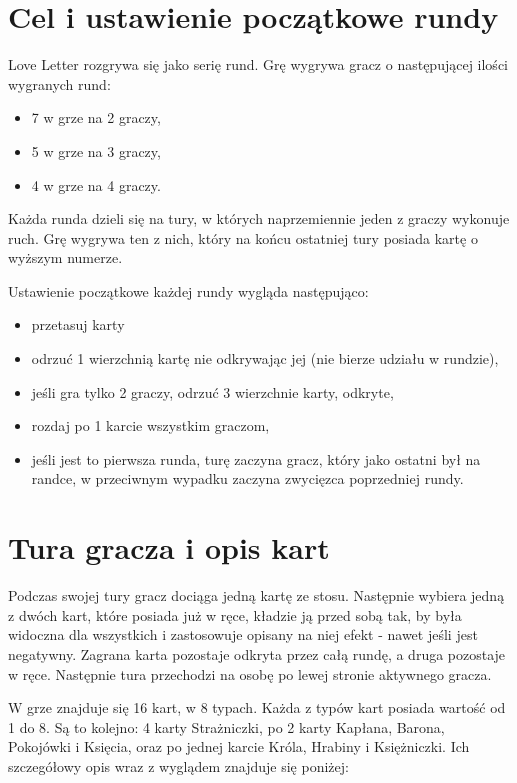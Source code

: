 \section*{Cel i ustawienie początkowe rundy}
\label{sec:celIUstawieniePoczatkowe}
Love Letter rozgrywa się jako serię rund. Grę wygrywa gracz o następującej ilości wygranych rund:
\begin{itemize}
	\item 7 w grze na 2 graczy,
	\item 5 w grze na 3 graczy,
	\item 4 w grze na 4 graczy.
\end{itemize}
Każda runda dzieli się na tury, w których naprzemiennie jeden z graczy wykonuje ruch. Grę wygrywa ten z nich, który na końcu ostatniej tury posiada kartę o wyższym numerze.

Ustawienie początkowe każdej rundy wygląda następująco:
\begin{itemize}
	\item przetasuj karty
	\item odrzuć 1 wierzchnią kartę nie odkrywając jej (nie bierze udziału w rundzie),
	\item jeśli gra tylko 2 graczy, odrzuć 3 wierzchnie karty, odkryte,
	\item rozdaj po 1 karcie wszystkim graczom,
	\item jeśli jest to pierwsza runda, turę zaczyna gracz, który jako ostatni był na randce, w przeciwnym wypadku zaczyna zwycięzca poprzedniej rundy.
\end{itemize}

\section*{Tura gracza i opis kart}
\label{sec:turaGracza}
Podczas swojej tury gracz dociąga jedną kartę ze stosu. Następnie wybiera jedną z dwóch kart, które posiada już w ręce, kładzie ją przed sobą tak, by była widoczna dla wszystkich i zastosowuje opisany na niej efekt - nawet jeśli jest negatywny. Zagrana karta pozostaje odkryta przez całą rundę, a druga pozostaje w ręce. Następnie tura przechodzi na osobę po lewej stronie aktywnego gracza.

W grze znajduje się 16 kart, w 8 typach. Każda z typów kart posiada wartość od 1 do 8. Są to kolejno: 4 karty Strażniczki, po 2 karty Kapłana, Barona, Pokojówki i Księcia, oraz po jednej karcie Króla, Hrabiny i Księżniczki. Ich szczegółowy opis wraz z wyglądem znajduje się poniżej:

